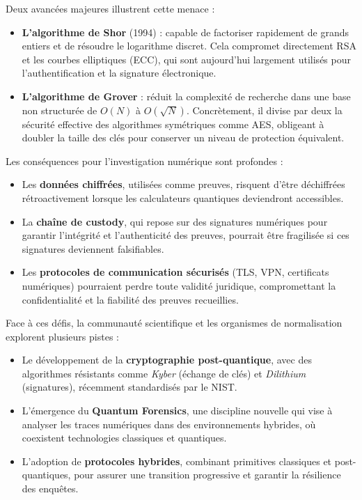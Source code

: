 \documentclass[memoire, 12pt]{report}
\begin{document}
Deux avancées majeures illustrent cette menace :  

\begin{itemize}
  \item \textbf{L’algorithme de Shor} (1994) : capable de factoriser rapidement 
  de grands entiers et de résoudre le logarithme discret. Cela compromet directement 
  RSA et les courbes elliptiques (ECC), qui sont aujourd’hui largement utilisés 
  pour l’authentification et la signature électronique.  

  \item \textbf{L’algorithme de Grover} : réduit la complexité de recherche dans 
  une base non structurée de $O(N)$ à $O(\sqrt{N})$. Concrètement, il divise par deux 
  la sécurité effective des algorithmes symétriques comme AES, obligeant à doubler 
  la taille des clés pour conserver un niveau de protection équivalent.  
\end{itemize}

Les conséquences pour l’investigation numérique sont profondes :  

\begin{itemize}
  \item Les \textbf{données chiffrées}, utilisées comme preuves, risquent d’être 
  déchiffrées rétroactivement lorsque les calculateurs quantiques deviendront accessibles.  

  \item La \textbf{chaîne de custody}, qui repose sur des signatures numériques 
  pour garantir l’intégrité et l’authenticité des preuves, pourrait être fragilisée 
  si ces signatures deviennent falsifiables.  

  \item Les \textbf{protocoles de communication sécurisés} (TLS, VPN, certificats 
  numériques) pourraient perdre toute validité juridique, compromettant la 
  confidentialité et la fiabilité des preuves recueillies.  
\end{itemize}

Face à ces défis, la communauté scientifique et les organismes de normalisation 
explorent plusieurs pistes :  

\begin{itemize}
  \item Le développement de la \textbf{cryptographie post-quantique}, avec des 
  algorithmes résistants comme \emph{Kyber} (échange de clés) et \emph{Dilithium} 
  (signatures), récemment standardisés par le NIST.  

  \item L’émergence du \textbf{Quantum Forensics}, une discipline nouvelle qui vise 
  à analyser les traces numériques dans des environnements hybrides, où coexistent 
  technologies classiques et quantiques.  

  \item L’adoption de \textbf{protocoles hybrides}, combinant primitives classiques 
  et post-quantiques, pour assurer une transition progressive et garantir la 
  résilience des enquêtes.  
\end{itemize}
\end{document}
